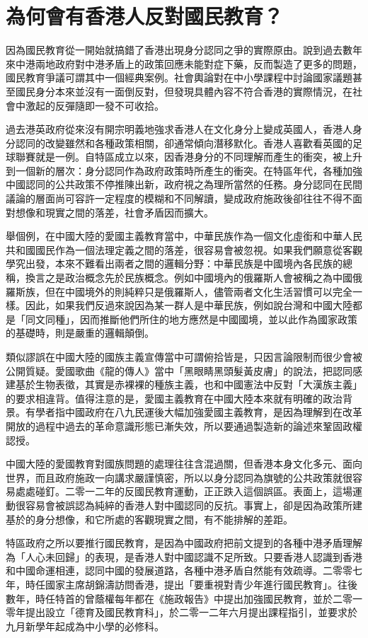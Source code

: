 \section{為何會有香港人反對國民教育？}
\label{sec:sec12}

因為國民教育從一開始就搞錯了香港出現身分認同之爭的實際原由。說到過去數年來中港兩地政府對中港矛盾上的政策回應未能對症下藥，反而製造了更多的問題，國民教育爭議可謂其中一個經典案例。社會輿論對在中小學課程中討論國家議題甚至國民身分本來並沒有一面倒反對，但發現具體內容不符合香港的實際情況，在社會中激起的反彈隨即一發不可收拾。

過去港英政府從來沒有開宗明義地強求香港人在文化身分上變成英國人，香港人身分認同的改變雖然和各種政策相關，卻通常傾向潛移默化。香港人喜歡看英國的足球聯賽就是一例。自特區成立以來，因香港身分的不同理解而產生的衝突，被上升到一個新的層次：身分認同作為政府政策時所產生的衝突。在特區年代，各種加強中國認同的公共政策不停推陳出新，政府視之為理所當然的任務。身分認同在民間議論的層面尚可容許一定程度的模糊和不同解讀，變成政府施政後卻往往不得不面對想像和現實之間的落差，社會矛盾因而擴大。

舉個例，在中國大陸的愛國主義教育當中，中華民族作為一個文化虛銜和中華人民共和國國民作為一個法理定義之間的落差，很容易會被忽視。如果我們願意從客觀學究出發，本來不難看出兩者之間的邏輯分野：中華民族是中國境內各民族的總稱，換言之是政治概念先於民族概念。例如中國境內的俄羅斯人會被稱之為中國俄羅斯族，但在中國境外的則純粹只是俄羅斯人，儘管兩者文化生活習慣可以完全一樣。因此，如果我們反過來說因為某一群人是中華民族，例如說台灣和中國大陸都是「同文同種」，因而推斷他們所住的地方應然是中國國境，並以此作為國家政策的基礎時，則是嚴重的邏輯顛倒。

類似謬誤在中國大陸的國族主義宣傳當中可謂俯拾皆是，只因言論限制而很少會被公開質疑。愛國歌曲《龍的傳人》當中「黑眼睛黑頭髮黃皮膚」的說法，把認同感建基於生物表徵，其實是赤裸裸的種族主義，也和中國憲法中反對「大漢族主義」的要求相違背。值得注意的是，愛國主義教育在中國大陸本來就有明確的政治背景。有學者指中國政府在八九民運後大幅加強愛國主義教育，是因為理解到在改革開放的過程中過去的革命意識形態已漸失效，所以要通過製造新的論述來鞏固政權認授。

中國大陸的愛國教育對國族問題的處理往往含混過關，但香港本身文化多元、面向世界，而且政府施政一向講求嚴謹慎密，所以以身分認同為旗號的公共政策就很容易處處碰釘。二零一二年的反國民教育運動，正正跌入這個誤區。表面上，這場運動很容易會被誤認為純綷的香港人對中國認同的反抗。事實上，卻是因為政策所建基於的身分想像，和它所處的客觀現實之間，有不能排解的差距。

特區政府之所以要推行國民教育，是因為中國政府把前文提到的各種中港矛盾理解為「人心未回歸」的表現，是香港人對中國認識不足所致。只要香港人認識到香港和中國命運相連，認同中國的發展道路，各種中港矛盾自然能有效疏導。二零零七年，時任國家主席胡錦濤訪問香港，提出「要重視對青少年進行國民教育」。往後數年，時任特首的曾蔭權每年都在《施政報告》中提出加強國民教育，並於二零一零年提出設立「德育及國民教育科」，於二零一二年六月提出課程指引，並要求於九月新學年起成為中小學的必修科。

